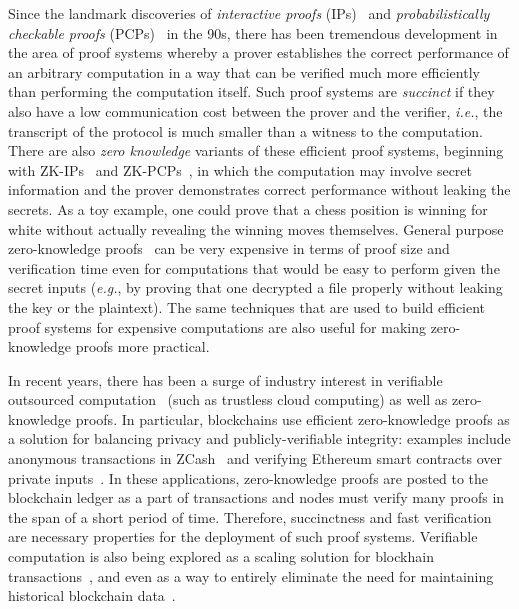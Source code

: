 
Since the landmark discoveries of \emph{interactive proofs} (IPs)~\cite{STOC:GolMicRac85} and %
\emph{probabilistically checkable proofs} (PCPs)~\cite{STOC:BFLS91,FOCS:ALMSS92} in the 90s, there has been tremendous development in the area of proof systems whereby a prover establishes the correct performance of an arbitrary computation in a way that can be verified much more efficiently than performing the computation itself. Such proof systems are \emph{succinct} if they also have a low communication cost between the prover and the verifier, \emph{i.e.}, the transcript of the protocol is much smaller than a witness to the computation. There are also \emph{zero knowledge} variants of these efficient proof systems, beginning with ZK-IPs~\cite{C:BGGHKMR88} and ZK-PCPs~\cite{STOC:Kilian92}, in which the computation may involve secret information and the prover demonstrates correct performance without leaking the secrets. As a toy example, one could prove that a chess position is winning for white without actually revealing the winning moves themselves. General purpose zero-knowledge proofs~\cite{JACM:GMW91} can be very expensive in terms of proof size and verification time even for computations that would be easy to perform given the secret inputs (\emph{e.g.}, by proving that one decrypted a file properly without leaking the key or the plaintext). The same techniques that are used to build efficient proof systems for expensive computations are also useful for making zero-knowledge proofs more practical. 
 
In recent years, there has been a surge of industry interest in verifiable outsourced computation~\cite{WalBlu15} (such as trustless cloud computing) as well as zero-knowledge proofs. In particular, blockchains use efficient zero-knowledge proofs as a solution for balancing privacy and publicly-verifiable integrity: examples include anonymous transactions in ZCash~\cite{SP:BCGGMT14,Zcash, ZcashProtocol} and verifying Ethereum smart contracts over private inputs~\cite{Zokrates}. In these applications, zero-knowledge proofs are posted to the blockchain ledger as a part of transactions and nodes must verify many proofs in the span of a short period of time. Therefore, succinctness and fast verification are necessary properties for the deployment of such proof systems. Verifiable computation is also being explored as a scaling solution for blockhain transactions~\cite{ZK-rollup}, and even as a way to entirely eliminate the need for maintaining historical blockchain data~\cite{Coda}. 

